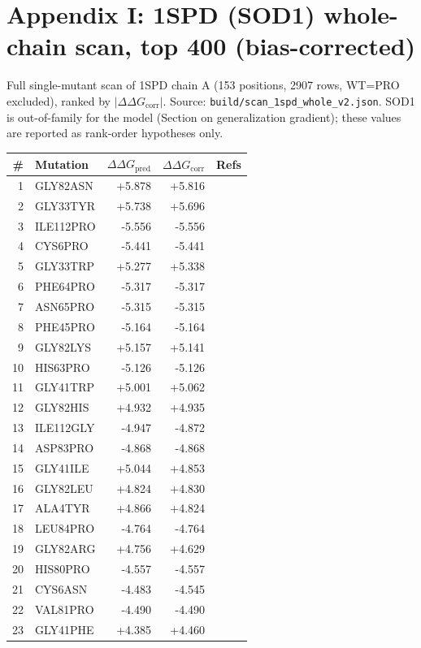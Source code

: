 \section*{Appendix I: 1SPD (SOD1) whole-chain scan, top 400 (bias-corrected)}
Full single-mutant scan of 1SPD chain A (153 positions, 2907 rows, WT=PRO
excluded), ranked by $|\Delta\Delta G_{\mathrm{corr}}|$. Source:
\texttt{build/scan\_1spd\_whole\_v2.json}. SOD1 is out-of-family for the
model (Section on generalization gradient); these values are reported as
rank-order hypotheses only.
\begin{longtable}{r l r r c}
\hline
\# & Mutation & $\Delta\Delta G_{\mathrm{pred}}$ & $\Delta\Delta G_{\mathrm{corr}}$ & Refs \\ \hline
\endhead
1 & GLY82ASN & +5.878 & +5.816 &  \\
2 & GLY33TYR & +5.738 & +5.696 &  \\
3 & ILE112PRO & -5.556 & -5.556 &  \\
4 & CYS6PRO & -5.441 & -5.441 &  \\
5 & GLY33TRP & +5.277 & +5.338 &  \\
6 & PHE64PRO & -5.317 & -5.317 &  \\
7 & ASN65PRO & -5.315 & -5.315 &  \\
8 & PHE45PRO & -5.164 & -5.164 &  \\
9 & GLY82LYS & +5.157 & +5.141 &  \\
10 & HIS63PRO & -5.126 & -5.126 &  \\
11 & GLY41TRP & +5.001 & +5.062 &  \\
12 & GLY82HIS & +4.932 & +4.935 &  \\
13 & ILE112GLY & -4.947 & -4.872 &  \\
14 & ASP83PRO & -4.868 & -4.868 &  \\
15 & GLY41ILE & +5.044 & +4.853 &  \\
16 & GLY82LEU & +4.824 & +4.830 &  \\
17 & ALA4TYR & +4.866 & +4.824 &  \\
18 & LEU84PRO & -4.764 & -4.764 &  \\
19 & GLY82ARG & +4.756 & +4.629 &  \\
20 & HIS80PRO & -4.557 & -4.557 &  \\
21 & CYS6ASN & -4.483 & -4.545 &  \\
22 & VAL81PRO & -4.490 & -4.490 &  \\
23 & GLY41PHE & +4.385 & +4.460 &  \\

\end{longtable}
